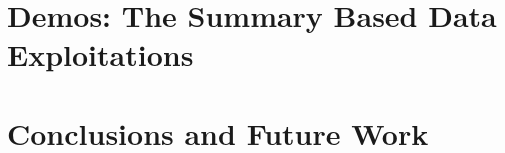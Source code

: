 \documentclass{llncs}
\begin{document}


\vspace{-2mm}
\section{Demos: The Summary Based Data Exploitations }

%

\vspace{-3mm}
\section{Conclusions and Future Work}\label{sec:Conclusions}





%
\vspace{-5mm}





\clearpage
{} %
\renewcommand{\indexname}{Author Index}
\printindex \clearpage
{} %
\renewcommand{\indexname}{Subject Index}
%
\end{document}
